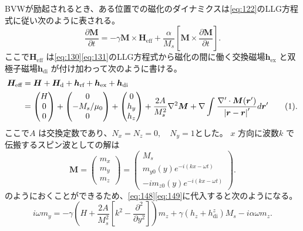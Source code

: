 \documentclass[dvipdfmx,11pt]{jsreport}
\numberwithin{equation}{chapter}
\numberwithin{table}{chapter}
\begin{document}
BVWが励起されるとき、ある位置での磁化のダイナミクスは\eqref{eq:122}のLLG方程式に従い次のように表される。
\begin{equation}
\label{eq:148}
	\frac{\partial \bm{M}}{\partial t} =-\gamma \bm{M}\times \bm{H}_\text{eff} +\frac{\alpha}{M_s}\left[ \bm{M}\times \frac{\partial \bm{M}}{\partial t}  \right] 
.\end{equation}
ここで$\bm{H}_\text{eff} $ は\eqref{eq:130}\eqref{eq:131}のLLG方程式から磁化の間に働く交換磁場$\bm{h}_\text{ex} $ と双極子磁場$\bm{h}_\text{di} $ が付け加わって次のように書ける。
\begin{align*}
\label{eq:149}
	\bm{H}_\text{eff} &=\bm{H}+\bm{H}_\text{d} +\bm{h}_\text{rf} +\bm{h}_\text{ex} +\bm{h}_\text{di}\\
					  &=\begin{pmatrix} H\\0\\0 \end{pmatrix} +\begin{pmatrix} 0\\-M_s /\mu_0\\0 \end{pmatrix} +\begin{pmatrix} 0 \\ h_y \\h_z \end{pmatrix} +\frac{2A}{M_s^2}\nabla ^2\bm{M}+\nabla \int_{}^{} \frac{\nabla '\cdot \bm{M}(\bm{r}')}{\abs{\bm{r}-\bm{r}}'}d\bm{r}'
					  \stepcounter{equation}\tag{\theequation} 
.\end{align*}
ここで$A$ は交換定数であり、$N_x=N_z=0,\quad N_y=1$とした。
$x$ 方向に波数$k$ で伝搬するスピン波としての解は
\begin{equation}
\label{eq:150}
	\bm{M}=\begin{pmatrix} m_x\\m_y\\m_z \end{pmatrix} =\begin{pmatrix} M_s\\m_{y 0}(y)e^{-i(kx-\omega t)}\\ -im_{z 0 }(y)e^{-i(kx-\omega t)} \end{pmatrix} 
.\end{equation}
のようにおくことができるため、\eqref{eq:148}\eqref{eq:149}に代入すると次のようになる。
\begin{equation}
\label{eq:151}
	i\omega m_y=-\gamma \left( H+\frac{2A}{M_s^2}\left[ k^2-\frac{\partial ^2}{\partial y^2}  \right]  \right) m_z+\gamma(h_z+h^{z}_\text{di} )M_s-i\alpha\omega m_z
.\end{equation}
\end{document}
